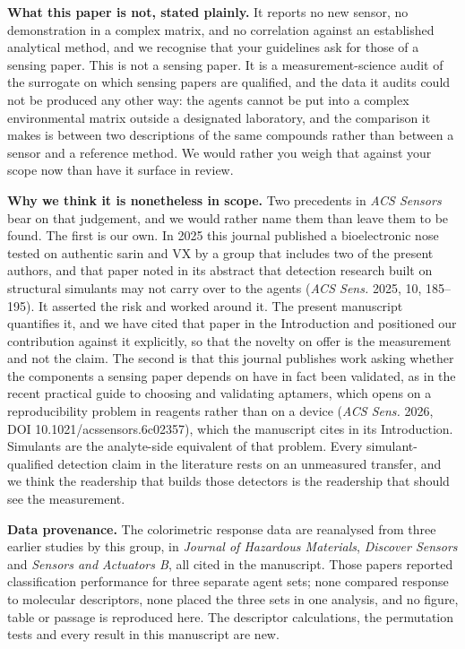 \documentclass[11pt,letterpaper]{article}
\begin{document}
\textbf{What this paper is not, stated plainly.} It reports no new sensor, no
demonstration in a complex matrix, and no correlation against an established
analytical method, and we recognise that your guidelines ask for those of a
sensing paper. This is not a sensing paper. It is a measurement-science audit
of the surrogate on which sensing papers are qualified, and the data it audits
could not be produced any other way: the agents cannot be put into a complex
environmental matrix outside a designated laboratory, and the comparison it
makes is between two descriptions of the same compounds rather than between a
sensor and a reference method. We would rather you weigh that against your
scope now than have it surface in review.

\textbf{Why we think it is nonetheless in scope.} Two precedents in
\textit{ACS Sensors} bear on that judgement, and we would rather name them
than leave them to be found. The first is our own. In 2025 this journal
published a bioelectronic nose tested on authentic sarin and VX by a group
that includes two of the present authors, and that paper noted in its
abstract that detection research built on structural simulants may not carry
over to the agents (\textit{ACS Sens.} 2025, 10, 185--195). It asserted the
risk and worked around it. The present manuscript quantifies it, and we have
cited that paper in the Introduction and positioned our contribution against
it explicitly, so that the novelty on offer is the measurement and not the
claim. The second is that this journal publishes work asking whether the
components a sensing paper depends on have in fact been validated, as in the
recent practical guide to choosing and validating aptamers, which opens on a
reproducibility problem in reagents rather than on a device
(\textit{ACS Sens.} 2026, DOI 10.1021/acssensors.6c02357), which the
manuscript cites in its Introduction. Simulants are the
analyte-side equivalent of that problem. Every simulant-qualified detection
claim in the literature rests on an unmeasured transfer, and we think the
readership that builds those detectors is the readership that should see the
measurement.

\textbf{Data provenance.} The colorimetric response data are reanalysed from
three earlier studies by this group, in \textit{Journal of Hazardous
Materials}, \textit{Discover Sensors} and \textit{Sensors and Actuators B},
all cited in the manuscript. Those papers reported classification performance
for three separate agent sets; none compared response to molecular descriptors,
none placed the three sets in one analysis, and no figure, table or passage is
reproduced here. The descriptor calculations, the permutation tests and every
result in this manuscript are new.
\end{document}

